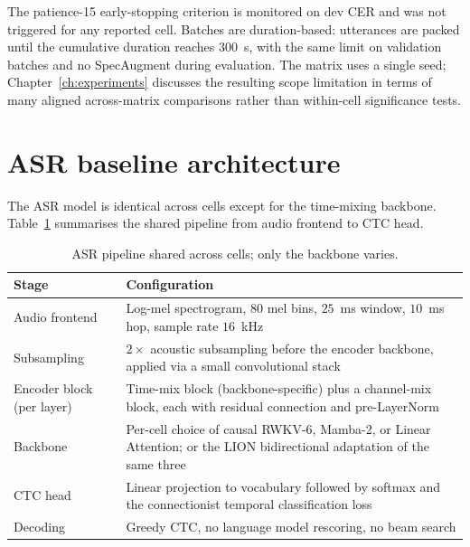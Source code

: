 The patience-15 early-stopping criterion is monitored on dev CER
and was not triggered for any reported cell. Batches are
duration-based: utterances are packed until the cumulative
duration reaches $300$~s, with the same limit on validation
batches and no SpecAugment during evaluation. The matrix uses a
single seed; Chapter~\ref{ch:experiments} discusses the resulting
scope limitation in terms of many aligned across-matrix
comparisons rather than within-cell significance tests.

\section{ASR baseline architecture}\label{app:setup:arch}

The ASR model is identical across cells except for the time-mixing
backbone. Table~\ref{tab:setup:arch} summarises the shared pipeline
from audio frontend to CTC head.

\begin{table}[!htbp]
\centering
\small
\caption[ASR baseline architecture]{ASR pipeline shared across
cells; only the backbone varies.}
\label{tab:setup:arch}
\setlength{\tabcolsep}{6pt}
\renewcommand{\arraystretch}{1.15}
\begin{tabularx}{\linewidth}{@{}p{3.5cm} X@{}}
\toprule
\textbf{Stage} & \textbf{Configuration} \\
\midrule
Audio frontend & Log-mel spectrogram, $80$ mel bins, $25$~ms window,
$10$~ms hop, sample rate $16$~kHz \\
\addlinespace
Subsampling & $2\times$ acoustic subsampling before the encoder
backbone, applied via a small convolutional stack \\
\addlinespace
Encoder block (per layer) & Time-mix block (backbone-specific) plus a
channel-mix block, each with residual connection and pre-LayerNorm \\
\addlinespace
Backbone & Per-cell choice of causal RWKV-6, Mamba-2, or Linear
Attention; or the LION bidirectional adaptation of the same three \\
\addlinespace
CTC head & Linear projection to vocabulary followed by softmax and
the connectionist temporal classification
loss~\cite{graves2006ctc} \\
\addlinespace
Decoding & Greedy CTC, no language model rescoring, no beam search \\
\bottomrule
\end{tabularx}
\end{table}

